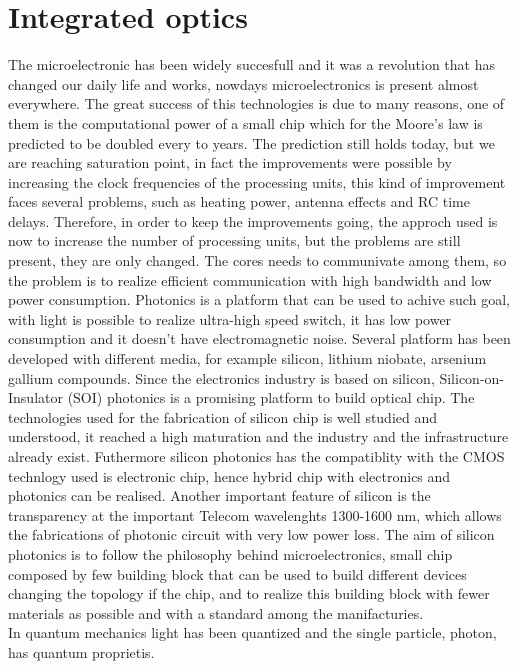 \documentclass[12pt]{book}
\begin{document}
\section{Integrated optics}
The microelectronic has been widely succesfull and it was a revolution that has changed our daily life and works, nowdays microelectronics is present almost everywhere. The great success of this technologies is due to many reasons, one of them is the computational power of a small chip which for the Moore's law is predicted to be doubled every to years. The prediction still holds today, but we are reaching saturation point, in fact the improvements were possible by increasing the clock frequencies of the processing units, this kind of improvement faces several problems, such as heating power, antenna effects and RC time delays. Therefore, in order to keep the improvements going, the approch used is now to increase the number of processing units, but the problems are still present, they are only changed. The cores needs to communivate among them, so the problem is to realize efficient communication with high bandwidth and low power consumption. Photonics is a platform that can be used to achive such goal, with light is possible to realize ultra-high speed switch, it has low power consumption and it doesn't have electromagnetic noise. Several platform has been developed with different media, for example silicon, lithium niobate, arsenium gallium compounds. Since the electronics industry is based on silicon, Silicon-on-Insulator (SOI) photonics is a promising platform to build optical chip. The technologies used for the fabrication of silicon chip is well studied and understood, it reached a high maturation and the industry and the infrastructure already exist. Futhermore silicon photonics has the compatiblity with the CMOS technlogy used is electronic chip, hence hybrid chip with electronics and photonics can be realised. Another important feature of silicon is the transparency at the important Telecom wavelenghts 1300-1600 nm, which allows the fabrications of photonic circuit with very low power loss. The aim of silicon photonics is to follow the philosophy behind microelectronics, small chip composed by few building block that can be used to build different devices changing the topology if the chip, and to realize this building block with fewer materials as possible and with a standard among the manifacturies.\\
In quantum mechanics light has been quantized and the single particle, photon, has quantum proprietis.\\
\end{document}
